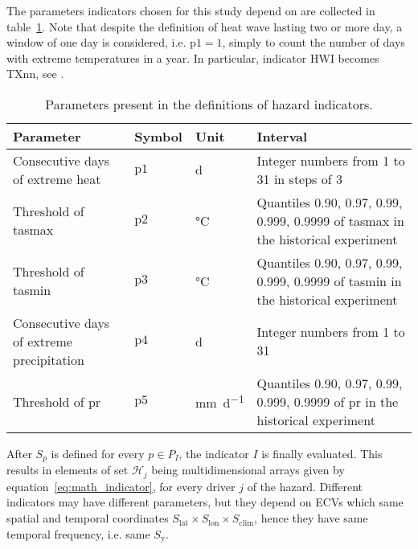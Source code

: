 The parameters indicators chosen for this study depend on are collected in table~\ref{tab:indicators_parameters}. Note that despite the definition of heat wave lasting two or more day, a window of one day is considered, i.e. $\mathrm{p1} = 1$, simply to count the number of days with extreme temperatures in a year. In particular, indicator $\mathrm{HWI}$ becomes $\mathrm{TXnn}$, see \cite[2209]{2021GutierrezAnnexVI}.
\begin{table}[h]
  \centering
  \caption{Parameters present in the definitions of hazard indicators.}
  \label{tab:indicators_parameters}
  \begin{tabular}{p{}llp{}}
    Parameter                                  & Symbol        & Unit                        & Interval                                                                               \\
    \hline
    Consecutive days of extreme heat           & $\mathrm{p1}$ & \unit{\day}                 & Integer numbers from 1 to 31 in steps of 3                                             \\  %
    Threshold of \gls{tasmax}                  & $\mathrm{p2}$ & \unit{\degreeCelsius}       & Quantiles 0.90, 0.97, 0.99, 0.999, 0.9999 of \gls{tasmax} in the historical experiment \\
    Threshold of \gls{tasmin}                  & $\mathrm{p3}$ & \unit{\degreeCelsius}       & Quantiles 0.90, 0.97, 0.99, 0.999, 0.9999 of \gls{tasmin} in the historical experiment \\
    Consecutive days of extreme precipitation  & $\mathrm{p4}$ & \unit{\day}                 & Integer numbers from 1 to 31                                                           \\  %
    Threshold of \gls{pr}                      & $\mathrm{p5}$ & \unit{\milli\metre\per\day} & Quantiles 0.90, 0.97, 0.99, 0.999, 0.9999 of \gls{pr} in the historical experiment     \\
  \end{tabular}
\end{table}

After $S_p$ is defined for every $p \in P_I$, the \gls{indicator} $I$ is finally evaluated. This results in elements of set $\mathcal{H}_j$ being multidimensional arrays given by equation~\eqref{eq:math_indicator}, for every \gls{driver} $j$ of the \gls{hazard}. Different \glspl{indicator} may have different parameters, but they depend on \glspl{ECV} which same spatial and temporal coordinates $S_\text{lat} \times S_\text{lon} \times S_\text{clim}$, hence they have same temporal frequency, i.e. same $S_\text{y}$.


